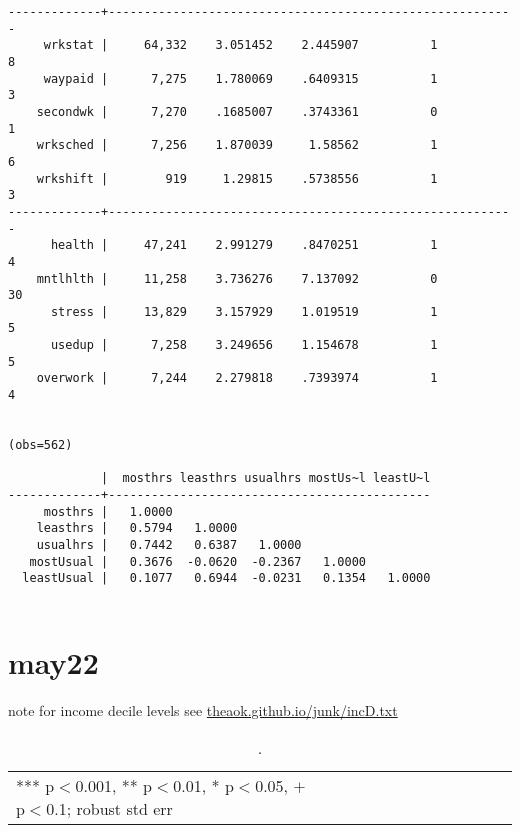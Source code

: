 \documentclass[10pt, letterpaper]{article}
\begin{document}
\begin{spacing}{1.4}
{\begin{spacing}{.9}
\begin{verbatim}
-------------+---------------------------------------------------------
     wrkstat |     64,332    3.051452    2.445907          1          8
     waypaid |      7,275    1.780069    .6409315          1          3
    secondwk |      7,270    .1685007    .3743361          0          1
    wrksched |      7,256    1.870039     1.58562          1          6
    wrkshift |        919     1.29815    .5738556          1          3
-------------+---------------------------------------------------------
      health |     47,241    2.991279    .8470251          1          4
    mntlhlth |     11,258    3.736276    7.137092          0         30
      stress |     13,829    3.157929    1.019519          1          5
      usedup |      7,258    3.249656    1.154678          1          5
    overwork |      7,244    2.279818    .7393974          1          4


(obs=562)

             |  mosthrs leasthrs usualhrs mostUs~l leastU~l
-------------+---------------------------------------------
     mosthrs |   1.0000
    leasthrs |   0.5794   1.0000
    usualhrs |   0.7442   0.6387   1.0000
   mostUsual |   0.3676  -0.0620  -0.2367   1.0000
  leastUsual |   0.1077   0.6944  -0.0231   0.1354   1.0000


\end{verbatim}
\end{spacing}
}

\section{may22}

note for income decile levels see \url{theaok.github.io/junk/incD.txt}



\begin{spacing}{.9}
  \begin{table}[H]\centering \caption{.} \label{fA} \begin{scriptsize} \begin{tabular}{p{1.8in}p{.5in}p{.5in}p{.5in}p{.5in}p{.5in}p{.5in}p{.5in}p{.5in}p{.5in}p{.5
            in}p{.5in}p{.5 in}}\hline
        
\hline  *** p$<$0.001, ** p$<$0.01, * p$<$0.05, $+$ p$<$0.1; robust std err
         \end{tabular}\end{scriptsize}\end{table}
\end{spacing}


\end{spacing}
\end{document}

